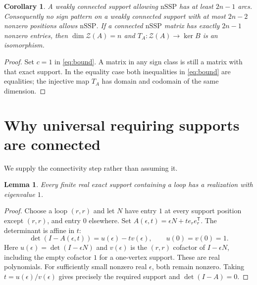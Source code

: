 \documentclass[11pt]{article}
\newtheorem{lemma}[theorem]{Lemma}
\newtheorem{corollary}[theorem]{Corollary}
\newcommand{\Zc}{\mathcal Z}
\newcommand{\nssp}{\mathrm{nSSP}}
\begin{document}
\begin{corollary}\label{cor:connected}
A weakly connected support allowing $\nssp$ has at least $2n-1$
arcs. Consequently no sign pattern on a weakly connected support with
at most $2n-2$ nonzero positions allows $\nssp$.
If a connected $\nssp$ matrix has exactly $2n-1$ nonzero entries,
then $\dim\Zc(A)=n$ and $T_A:\Zc(A)\to\ker B$ is an isomorphism.
\end{corollary}
\begin{proof}
Set $c=1$ in \eqref{eq:bound}. A matrix in any sign class is still a
matrix with that exact support. In the equality case both inequalities
in \eqref{eq:bound} are equalities; the injective map $T_A$ has domain
and codomain of the same dimension.
\end{proof}

\section{Why universal requiring supports are connected}
We supply the connectivity step rather than assuming it.

\begin{lemma}\label{lem:realize}
Every finite real exact support containing a loop has a realization
with eigenvalue $1$.
\end{lemma}
\begin{proof}
Choose a loop $(r,r)$ and let $N$ have entry $1$ at every support
position except $(r,r)$, and entry $0$ elsewhere. Set
$A(\epsilon,t)=\epsilon N+t e_re_r^{\mathsf T}$.
The determinant is affine in $t$:
\[
 \det(I-A(\epsilon,t))=u(\epsilon)-t v(\epsilon),
 \qquad u(0)=v(0)=1.
\]
Here $u(\epsilon)=\det(I-\epsilon N)$ and $v(\epsilon)$ is the
$(r,r)$ cofactor of $I-\epsilon N$, including the empty cofactor $1$
for a one-vertex support. These are real polynomials. For sufficiently
small nonzero real $\epsilon$, both remain nonzero. Taking
$t=u(\epsilon)/v(\epsilon)$ gives precisely the required support and
$\det(I-A)=0$.
\end{proof}
\end{document}
